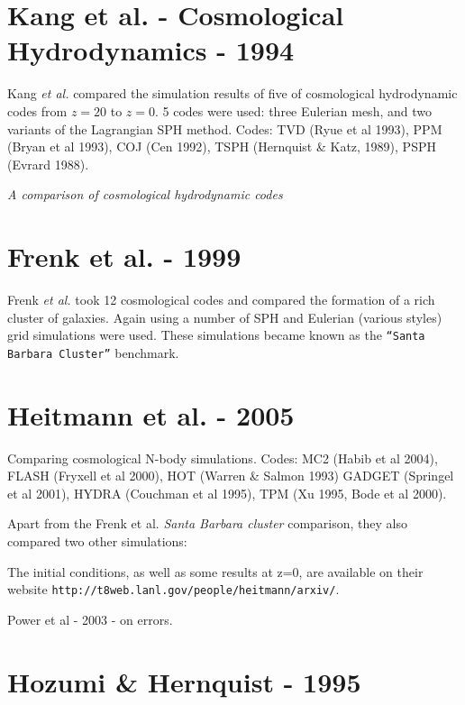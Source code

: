 \begin{itemize}
\begin{itemize}

\section{Kang et al. - Cosmological Hydrodynamics - 1994}



Kang {\it et al. } compared the simulation results of five
of cosmological hydrodynamic codes from $z=20$ to $z=0$. 5 codes
were used: three Eulerian mesh, and two variants of the
Lagrangian SPH method.
Codes: 
TVD (Ryue et al 1993),
PPM (Bryan et al 1993),
COJ (Cen 1992),
TSPH (Hernquist \& Katz, 1989),
PSPH (Evrard 1988).

{\it A comparison of cosmological hydrodynamic codes}

\section{Frenk  et al. - 1999}

Frenk {\it et al. } took 12 cosmological codes and compared the
formation of a rich cluster of galaxies.
Again using a number of SPH and
Eulerian (various styles) grid simulations were used.
\smallskip
These simulations became known as the {\tt ``Santa Barbara Cluster''}
benchmark.

\section{Heitmann et al. - 2005}

Comparing cosmological N-body simulations. Codes:
MC2 (Habib et al 2004), %
FLASH (Fryxell et al 2000),
HOT (Warren \& Salmon 1993) %
GADGET (Springel et al 2001),
HYDRA (Couchman et al 1995),
TPM (Xu 1995, Bode et al 2000).

Apart from the Frenk et al. {\it Santa Barbara cluster} comparison, they
also compared two other simulations:

The initial conditions, as well as some results at z=0, are available
on their website {\tt http://t8web.lanl.gov/people/heitmann/arxiv/}.

Power et al - 2003 - on errors.


\section{Hozumi \& Hernquist - 1995}


\end{itemize}
\end{itemize}
